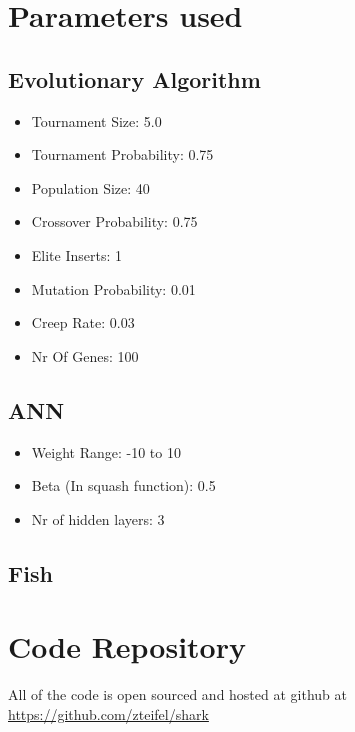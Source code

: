 \section{Parameters used\label{app:param}}
\subsection{Evolutionary Algorithm}
\begin{itemize}
\item Tournament Size: 5.0
\item Tournament Probability: 0.75
\item Population Size: 40
\item Crossover Probability: 0.75
\item Elite Inserts: 1
\item Mutation Probability: 0.01
\item Creep Rate: 0.03
\item Nr Of Genes: 100
\end{itemize}

\subsection{ANN}
\begin{itemize}
\item Weight Range: -10 to 10
\item Beta (In squash function): 0.5
\item Nr of hidden layers: 3
\end{itemize}

\subsection{Fish}

\section{Code Repository}
All of the code is open sourced and hosted at github at \url{https://github.com/zteifel/shark}

